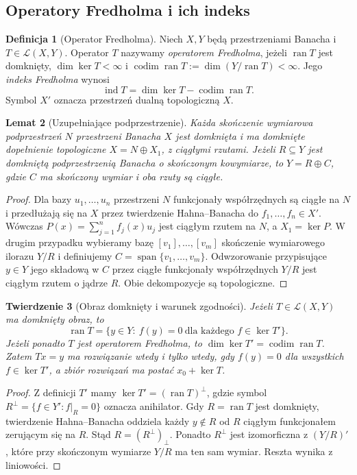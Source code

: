 \documentclass[11pt,a4paper]{article}
\numberwithin{equation}{section}
\theoremstyle{plain}
\newtheorem{twierdzenie}{Twierdzenie}[section]
\newtheorem{lemat}[twierdzenie]{Lemat}
\theoremstyle{definition}
\newtheorem{definicja}[twierdzenie]{Definicja}
\theoremstyle{remark}
\begin{document}
\subsection{Operatory Fredholma i ich indeks}

\begin{definicja}[Operator Fredholma]
\label{def:fredholm30}
Niech $X,Y$ będą przestrzeniami Banacha i $T\in\mathcal L(X,Y)$.
Operator $T$ nazywamy \emph{operatorem Fredholma}, jeżeli
$\operatorname{ran}T$ jest domknięty, $\dim\ker T<\infty$ i
$\operatorname{codim}\operatorname{ran}T:=\dim(Y/\operatorname{ran}T)<\infty$.
Jego \emph{indeks Fredholma} wynosi
\[\operatorname{ind}T=\dim\ker T-\operatorname{codim}\operatorname{ran}T.\]
Symbol $X'$ oznacza przestrzeń dualną topologiczną $X$.
\end{definicja}

\begin{lemat}[Uzupełniające podprzestrzenie]
\label{lem:fredholm-complements30}
Każda skończenie wymiarowa podprzestrzeń $N$ przestrzeni Banacha
$X$ jest domknięta i ma domknięte dopełnienie topologiczne
$X=N\oplus X_1$, z ciągłymi rzutami. Jeżeli $R\subseteq Y$
jest domkniętą podprzestrzenią Banacha o skończonym kowymiarze,
to $Y=R\oplus C$, gdzie $C$ ma skończony wymiar i oba rzuty
są ciągłe.
\end{lemat}
\begin{proof}
Dla bazy $u_1,\ldots,u_n$ przestrzeni $N$ funkcjonały
współrzędnych są ciągłe na $N$ i przedłużają się na $X$
przez twierdzenie Hahna--Banacha do $f_1,\ldots,f_n\in X'$.
Wówczas $P(x)=\sum_{j=1}^n f_j(x)u_j$ jest ciągłym rzutem
na $N$, a $X_1=\ker P$. W drugim przypadku wybieramy bazę
$[v_1],\ldots,[v_m]$ skończenie wymiarowego ilorazu $Y/R$
i definiujemy $C=\operatorname{span}\{v_1,\ldots,v_m\}$.
Odwzorowanie przypisujące $y\in Y$ jego składową w $C$
przez ciągłe funkcjonały współrzędnych $Y/R$ jest ciągłym
rzutem o jądrze $R$. Obie dekompozycje są topologiczne.
\end{proof}

\begin{twierdzenie}[Obraz domknięty i warunek zgodności]
\label{thm:fredholm-compatibility30}
Jeżeli $T\in\mathcal L(X,Y)$ ma domknięty obraz, to
\[\operatorname{ran}T=\{y\in Y:\ f(y)=0\ \text{dla każdego }f\in\ker T'\}.\]
Jeżeli ponadto $T$ jest operatorem Fredholma, to
$\dim\ker T'=\operatorname{codim}\operatorname{ran}T$.
Zatem $Tx=y$ ma rozwiązanie wtedy i tylko wtedy, gdy
$f(y)=0$ dla wszystkich $f\in\ker T'$, a zbiór
rozwiązań ma postać $x_0+\ker T$.
\end{twierdzenie}
\begin{proof}
Z definicji $T'$ mamy $\ker T'=(\operatorname{ran}T)^\perp$,
gdzie symbol $R^\perp=\{f\in Y':f|_R=0\}$ oznacza
anihilator. Gdy $R=\operatorname{ran}T$ jest domknięty,
twierdzenie Hahna--Banacha oddziela każdy $y\notin R$
od $R$ ciągłym funkcjonałem zerującym się na $R$.
Stąd $R=(R^\perp)_\perp$. Ponadto $R^\perp$ jest
izomorficzna z $(Y/R)'$, które przy skończonym wymiarze
$Y/R$ ma ten sam wymiar. Reszta wynika z liniowości.
\end{proof}
\end{document}
